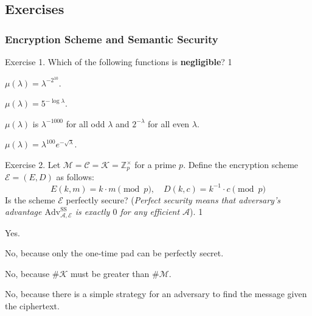\documentclass[../../book.tex]{subfiles}
\begin{document}
\subsection{Exercises}

\subsubsection*{Encryption Scheme and Semantic Security}

\begin{xexercise}
    {Exercise 1.}
    {Which of the following functions is \textbf{negligible}?}
    {1}
    {
        \item $\mu(\lambda) = \lambda^{-2^{10}}$.
        \item $\mu(\lambda) = 5^{-\log\lambda}$.
        \item $\mu(\lambda)$ is $\lambda^{-1000}$ for all odd $\lambda$ and $2^{-\lambda}$ for all even $\lambda$.
        \item $\mu(\lambda) = \lambda^{100}e^{-\sqrt{\lambda}}$.
    }
\end{xexercise}

\begin{xexercise}
    {Exercise 2.}
    {Let $\mathcal{M}=\mathcal{C}=\mathcal{K}=\mathbb{Z}_{p}^{\times}$ for a prime $p$. Define the encryption scheme $\mathcal{E}=(E,D)$ as follows:
    \begin{equation*}
        E(k,m) = k \cdot m \pmod{p}, \quad D(k,c) = k^{-1} \cdot c \pmod{p}
    \end{equation*}
    Is the scheme $\mathcal{E}$ perfectly secure? (\textit{Perfect security
    means that adversary's advantage $\text{Adv}^{\text{SS}}_{\mathcal{A},\mathcal{E}}$ is exactly $0$ for any efficient $\mathcal{A}$}).} {1} {
        \item Yes.
        \item No, because only the one-time pad can be perfectly secret.
        \item No, because $\#\mathcal{K}$ must be greater than $\#\mathcal{M}$.
        \item No, because there is a simple strategy for an adversary to find the message given the ciphertext.
    }
\end{xexercise}
\end{document}
